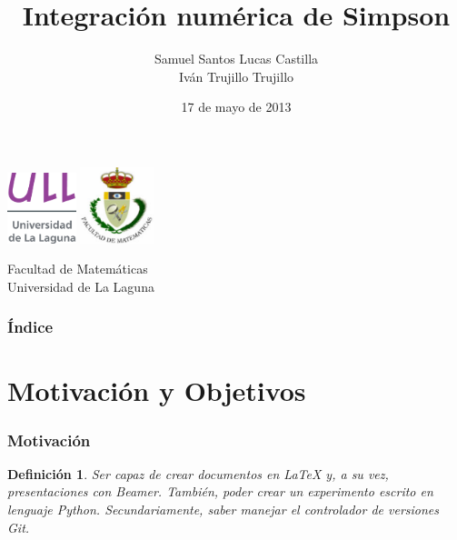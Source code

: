 \documentclass{beamer}
\title[Método Simpson]{Integración numérica de Simpson}
\author[Samuel e Iván]{Samuel Santos Lucas Castilla \\
                       Iván Trujillo Trujillo}
\institute[ULL]{Universidad de La Laguna}
\date[17-05-2013]{17 de mayo de 2013}
\newtheorem{definicion}{Definición}
\begin{document}
  

\begin{frame}

  \includegraphics[width=0.15\textwidth]{img/ullesc.eps}
  \hspace*{7.5cm}
  \includegraphics[width=0.16\textwidth]{img/fmatesc.eps}
  \titlepage

  \begin{scriptsize}
    \begin{center}
     Facultad de Matemáticas \\
     Universidad de La Laguna
    \end{center}
  \end{scriptsize}

\end{frame}

\begin{frame}
  \frametitle{Índice}  
  \tableofcontents[pausesections]
\end{frame}


\section{Motivación y Objetivos}


\begin{frame}

\frametitle{Motivación}

\begin{definicion}
	Ser capaz de crear documentos en LaTeX y, a su vez, presentaciones con Beamer.
También, poder crear un experimento escrito en lenguaje Python. Secundariamente, saber manejar
el controlador de versiones Git.
\end{definicion}

\end{frame}
\end{document}
